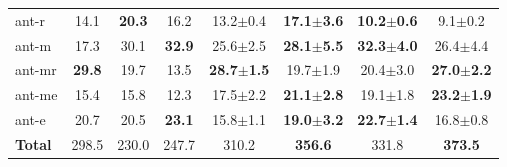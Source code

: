 \documentclass[11pt]{article}
\begin{document}
\begin{table}[htbp]
{\begin{tabular}{l|ccc|cc|cc}
    ant-r & 14.1 & \textbf{20.3} & 16.2 & 13.2$\pm$0.4 & \textbf{17.1$\pm$3.6} & \textbf{10.2$\pm$0.6} & 9.1$\pm$0.2 \\
    ant-m & 17.3 & 30.1 & \textbf{32.9} & 25.6$\pm$2.5 & \textbf{28.1$\pm$5.5} & \textbf{32.3$\pm$4.0} & 26.4$\pm$4.4 \\
    ant-mr & \textbf{29.8} & 19.7 & 13.5 & \textbf{28.7$\pm$1.5} & 19.7$\pm$1.9 & 20.4$\pm$3.0 & \textbf{27.0$\pm$2.2} \\
    ant-me & 15.4 & 15.8 & 12.3 & 17.5$\pm$2.2 & \textbf{21.1$\pm$2.8} & 19.1$\pm$1.8 & \textbf{23.2$\pm$1.9} \\
    ant-e & 20.7 & 20.5 & \textbf{23.1} & 15.8$\pm$1.1 & \textbf{19.0$\pm$3.2} & \textbf{22.7$\pm$1.4} & 16.8$\pm$0.8 \\ 
    \midrule
    \textbf{Total} & 298.5 & 230.0 & 247.7 & 310.2 & \textbf{356.6} & 331.8 & \textbf{373.5} \\ 
    \bottomrule
    \end{tabular}
}
\end{table}
\end{document}
